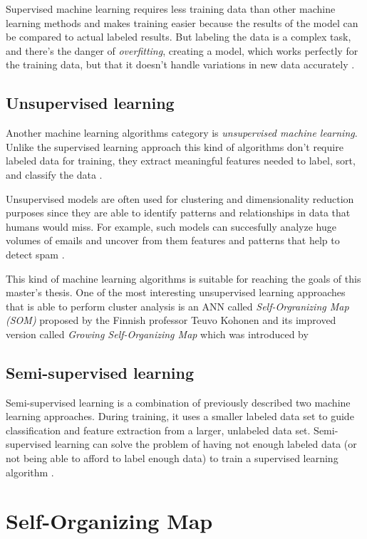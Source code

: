 \documentclass[thesis=M,english]{FITthesis}[2019/12/23]
\begin{document}
Supervised machine learning requires less training data than other machine learning methods and makes training easier because the results of the model can be compared to actual labeled results. But labeling the data is a complex task, and there's the danger of \textit{overfitting}, creating a model, which works perfectly for the training data, but that it doesn't handle variations in new data accurately \cite{ibm-ml}.
 
\subsection{Unsupervised learning}
Another machine learning algorithms category is \textit{unsupervised machine learning}. Unlike the supervised learning approach this kind of algorithms don't require labeled data for training, they extract meaningful features needed to label, sort, and classify the data \cite{ibm-unsupervised-learning}. 

Unsupervised models are often used for clustering and dimensionality reduction purposes since they are able to identify patterns and relationships in data that humans would miss. For example, such models can succesfully analyze huge volumes of emails and uncover from them features and patterns that help to detect spam \cite{ibm-ml}.

This kind of machine learning algorithms is suitable for reaching the goals of this master's thesis. One of the most interesting unsupervised learning approaches that is able to perform cluster analysis is an ANN called \textit{Self-Orgranizing Map (SOM)} proposed by the Finnish professor Teuvo Kohonen \cite{kohonen} and its improved version called \textit{Growing Self-Organizing Map} which was introduced by %

\subsection{Semi-supervised learning}
Semi-supervised learning is a combination of previously described two machine learning approaches. During training, it uses a smaller labeled data set to guide classification and feature extraction from a larger, unlabeled data set. Semi-supervised learning can solve the problem of having not enough labeled data (or not being able to afford to label enough data) to train a supervised learning algorithm \cite{ibm-ml}. 

\section{Self-Organizing Map}
\end{document}
